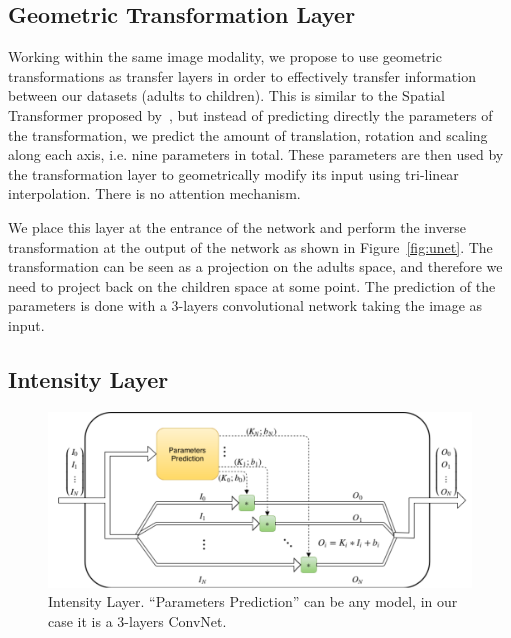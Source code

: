 \subsection{Geometric Transformation Layer}
\label{ssec:geo_transfo}

Working within the same image modality, we propose to use geometric transformations as transfer layers in order to effectively transfer information between our datasets (adults to children). This is similar to the Spatial Transformer proposed by~\textcite{jaderberg2015NIPS}, but instead of predicting directly the parameters of the transformation, we predict the amount of translation, rotation and scaling along each axis, i.e. nine parameters in total. These parameters are then used by the transformation layer to geometrically modify its input using tri-linear interpolation. There is no attention mechanism.

We place this layer at the entrance of the network and perform the inverse transformation at the output of the network as shown in Figure~\ref{fig:unet}. The transformation can be seen as a projection on the adults space, and therefore we need to project back on the children space at some point. The prediction of the parameters is done with a 3-layers convolutional network taking the image as input.

\subsection{Intensity Layer}
\label{ssec:intensity_transfo}

\begin{figure}[htb]
	\includegraphics[width=\textwidth]{img_transfer/Intensity_Block}
    \caption[Intensity Layer]{Intensity Layer. ``Parameters Prediction'' can be any model, in our case it is a 3-layers ConvNet.}
    \label{fig:block}
\end{figure}

